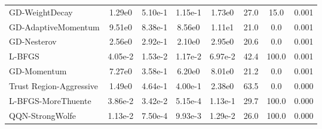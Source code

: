 \documentclass{article}
\begin{document}
\begin{table}[htbp]
{\begin{tabular}{p{2.5cm}*{7}{c}}
GD-WeightDecay & 1.29e0 & 5.10e-1 & 1.15e-1 & 1.73e0 & 27.0 & 15.0 & 0.001 \\
GD-AdaptiveMomentum & 9.51e0 & 8.38e-1 & 8.56e0 & 1.11e1 & 21.0 & 0.0 & 0.001 \\
GD-Nesterov & 2.56e0 & 2.92e-1 & 2.10e0 & 2.95e0 & 20.6 & 0.0 & 0.001 \\
L-BFGS & 4.05e-2 & 1.53e-2 & 1.17e-2 & 6.97e-2 & 42.4 & 100.0 & 0.001 \\
GD-Momentum & 7.27e0 & 3.58e-1 & 6.20e0 & 8.01e0 & 21.2 & 0.0 & 0.001 \\
Trust Region-Aggressive & 1.49e0 & 4.64e-1 & 4.00e-1 & 2.38e0 & 63.5 & 0.0 & 0.000 \\
L-BFGS-MoreThuente & 3.86e-2 & 3.42e-2 & 5.15e-4 & 1.13e-1 & 29.7 & 100.0 & 0.000 \\
QQN-StrongWolfe & 1.13e-2 & 7.50e-4 & 9.93e-3 & 1.29e-2 & 26.0 & 100.0 & 0.000 \\
\bottomrule
\end{tabular}
}
\end{table}
\end{document}
